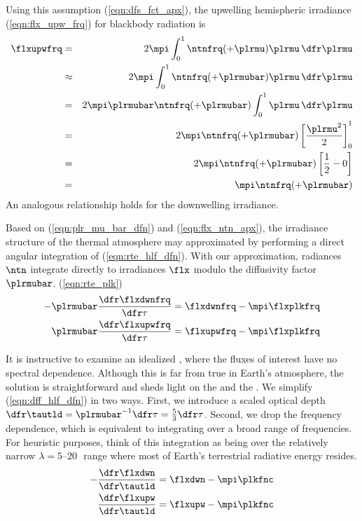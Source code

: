 \documentclass[12pt]{article}
\begin{document}
Using this assumption (\ref{eqn:dfs_fct_apx}), the upwelling
hemispheric irradiance (\ref{eqn:flx_upw_frq}) for blackbody radiation is
\begin{eqnarray}
\flxupwfrq & = & 
2 \mpi \int_{0}^{1} \ntnfrq (+\plrmu) \plrmu \, \dfr\plrmu \nonumber \\
& \approx & 2 \mpi \int_{0}^{1} \ntnfrq (+\plrmubar) \plrmu \, \dfr\plrmu \nonumber \\
& = & 2 \mpi \plrmubar \ntnfrq(+\plrmubar) \int_{0}^{1} \plrmu \, \dfr\plrmu \nonumber \\
& = & 2 \mpi \ntnfrq (+\plrmubar) \left[ \frac{\plrmu^{2}}{2} \right]_{0}^{1} \nonumber \\
& = & 2 \mpi \ntnfrq (+\plrmubar) \left[ \frac{1}{2} - 0 \right] \nonumber \\
& = & \mpi \ntnfrq (+\plrmubar) \nonumber \\
\label{eqn:flx_ntn_apx}
\end{eqnarray}
An analogous relationship holds for the downwelling irradiance.

Based on (\ref{eqn:plr_mu_bar_dfn}) and (\ref{eqn:flx_ntn_apx}),
the irradiance structure of the thermal atmosphere may approximated
by performing a direct angular integration of (\ref{eqn:rte_hlf_dfn}).
With our approximation, radiances $\ntn$ integrate directly to
irradiances $\flx$ modulo the diffusivity factor $\plrmubar$. 
(\ref{eqn:rte_plk})
\begin{subequations}
\label{eqn:dff_hlf_dfn}
\begin{align}
\label{eqn:dff_hlf_dwn_dfn}
-\plrmubar \frac{\dfr\flxdwnfrq}{\dfr\tau} & = \flxdwnfrq - \mpi\flxplkfrq \\
\label{eqn:dff_hlf_upw_dfn}
\plrmubar \frac{\dfr\flxupwfrq}{\dfr\tau} & = \flxupwfrq - \mpi\flxplkfrq
\end{align}
\end{subequations}

It is instructive to examine an idealized ,
where the fluxes of interest have no spectral dependence.
Although this is far from true in Earth's atmosphere, the solution is
straightforward and sheds light on the 
 and the 
. 
We simplify (\ref{eqn:dff_hlf_dfn}) in two ways.
First, we introduce a scaled optical depth
$\dfr\tautld = \plrmubar^{-1}\dfr\tau = \frac{5}{3}\dfr\tau$.
Second, we drop the frequency dependence, which is equivalent to
integrating over a broad range of frequencies.
For heuristic purposes, think of this integration as being over the
relatively narrow $\lambda = 5$--$20$\,\um\ range where most of
Earth's terrestrial radiative energy resides.
\begin{subequations}
\label{eqn:gry_hlf_dfn}
\begin{align}
\label{eqn:gry_hlf_dwn_dfn}
-\frac{\dfr\flxdwn}{\dfr\tautld} & = \flxdwn - \mpi\plkfnc \\
\label{eqn:gry_hlf_upw_dfn}
\frac{\dfr\flxupw}{\dfr\tautld} & = \flxupw - \mpi\plkfnc
\end{align}
\end{subequations}
\end{document}
